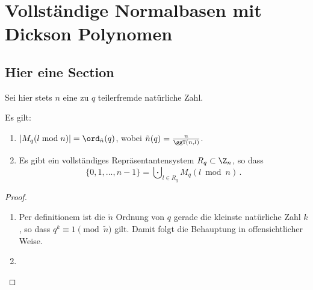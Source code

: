 \chapter{Vollständige Normalbasen mit Dickson Polynomen}

\section{Hier eine Section}

Sei hier stets $n$ eine zu $q$ teilerfremde natürliche Zahl.

\begin{lemma}
  Es gilt:
  \begin{enumerate}
    \item $| M_q(l\bmod n)| = \ord_{\tilde n}(q)$, 
      wobei $\tilde n(q) = \tfrac{n}{\ggT(n,l)}$.
    \item Es gibt ein vollständiges Repräsentantensystem $R_q \subset \Z_n$, so
      dass 
      \[ \{0,1,...,n-1\} = \bigcupdot_{l\in R_q} M_q(l \bmod n) \,.\]
  \end{enumerate}
\end{lemma}
\begin{proof}
  \begin{enumerate}
    \item Per definitionem ist die $\tilde n$ Ordnung von $q$ gerade die
      kleinste natürliche Zahl $k$, so dass $q^k \equiv 1 \pmod{\tilde n}$ gilt.
      Damit folgt die Behauptung in offensichtlicher Weise.
    \item 
  \end{enumerate}
\end{proof}

